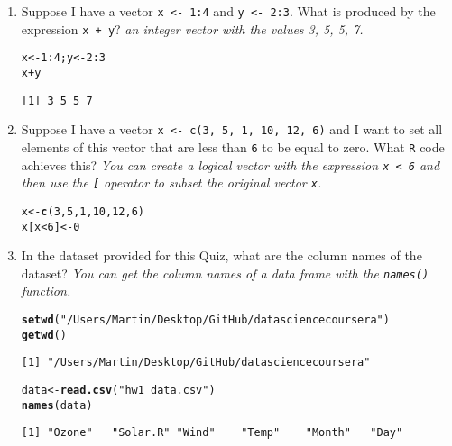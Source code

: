 \documentclass{article}\usepackage[]{graphicx}\usepackage[]{color}
\makeatletter
\newcommand{\hlnum}[1]{\textcolor[rgb]{0.686,0.059,0.569}{#1}}%
\newcommand{\hlstr}[1]{\textcolor[rgb]{0.192,0.494,0.8}{#1}}%
\newcommand{\hlopt}[1]{\textcolor[rgb]{0,0,0}{#1}}%
\newcommand{\hlstd}[1]{\textcolor[rgb]{0.345,0.345,0.345}{#1}}%
\newcommand{\hlkwb}[1]{\textcolor[rgb]{0.69,0.353,0.396}{#1}}%
\newcommand{\hlkwd}[1]{\textcolor[rgb]{0.737,0.353,0.396}{\textbf{#1}}}%
\newenvironment{kframe}{%
 \def\at@end@of@kframe{}%
 \ifinner\ifhmode%
  \def\at@end@of@kframe{\end{minipage}}%
  \begin{minipage}{\columnwidth}%
 \fi\fi%
 \def\FrameCommand##1{\hskip\@totalleftmargin \hskip-\fboxsep
 \colorbox{shadecolor}{##1}\hskip-\fboxsep
     \hskip-\linewidth \hskip-\@totalleftmargin \hskip\columnwidth}%
 \MakeFramed {\advance\hsize-\width
   \@totalleftmargin\z@ \linewidth\hsize
   \@setminipage}}%
 {\par\unskip\endMakeFramed%
 \at@end@of@kframe}
\newenvironment{knitrout}{}{} %
\makeatother
\begin{document}
\begin{enumerate}
  \item Suppose I have a vector \texttt{x <- 1:4} and \texttt{y <- 2:3}. What is produced by the expression \texttt{x + y}?  
  \emph{an integer vector with the values 3, 5, 5, 7.}
\begin{knitrout}
\color{fgcolor}\begin{kframe}
\begin{alltt}
  \hlstd{x} \hlkwb{<-} \hlnum{1}\hlopt{:}\hlnum{4}\hlstd{; y} \hlkwb{<-} \hlnum{2}\hlopt{:}\hlnum{3}
  \hlstd{x} \hlopt{+} \hlstd{y}
\end{alltt}
\begin{verbatim}
[1] 3 5 5 7
\end{verbatim}
\end{kframe}
\end{knitrout}

  \item Suppose I have a vector \texttt{x <- c(3, 5, 1, 10, 12, 6)} and I want to set all elements of this vector that are less than \texttt{6} to be equal to zero. What \texttt{R} code achieves this?
  \emph{You can create a logical vector with the expression \texttt{x < 6} and then use the \texttt{[} operator to subset the original vector \texttt{x}.}
\begin{knitrout}
\color{fgcolor}\begin{kframe}
\begin{alltt}
  \hlstd{x} \hlkwb{<-} \hlkwd{c}\hlstd{(}\hlnum{3}\hlstd{,} \hlnum{5}\hlstd{,} \hlnum{1}\hlstd{,} \hlnum{10}\hlstd{,} \hlnum{12}\hlstd{,} \hlnum{6}\hlstd{)}
  \hlstd{x[x} \hlopt{<} \hlnum{6}\hlstd{]} \hlkwb{<-} \hlnum{0}
\end{alltt}
\end{kframe}
\end{knitrout}

  \item In the dataset provided for this Quiz, what are the column names of the dataset?
  \emph{You can get the column names of a data frame with the \texttt{names()} function.}
\begin{knitrout}
\color{fgcolor}\begin{kframe}
\begin{alltt}
\hlkwd{setwd}\hlstd{(}\hlstr{"/Users/Martin/Desktop/GitHub/datasciencecoursera"}\hlstd{)}
\hlkwd{getwd}\hlstd{()}
\end{alltt}
\begin{verbatim}
[1] "/Users/Martin/Desktop/GitHub/datasciencecoursera"
\end{verbatim}
\begin{alltt}
\hlstd{data} \hlkwb{<-} \hlkwd{read.csv}\hlstd{(}\hlstr{"hw1_data.csv"}\hlstd{)}
\hlkwd{names}\hlstd{(data)}
\end{alltt}
\begin{verbatim}
[1] "Ozone"   "Solar.R" "Wind"    "Temp"    "Month"   "Day"    
\end{verbatim}
\end{kframe}
\end{knitrout}


\end{enumerate}
\end{document}
